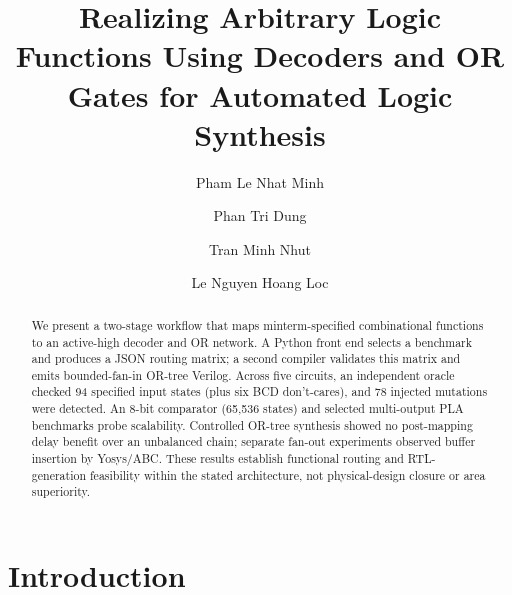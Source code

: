 \documentclass[runningheads]{llncs}
\begin{document}
\title{Realizing Arbitrary Logic Functions Using Decoders and OR Gates for Automated Logic Synthesis}


\author{
Pham Le Nhat Minh \and
Phan Tri Dung \and
Tran Minh Nhut \and
Le Nguyen Hoang Loc
}



\maketitle

\begin{abstract}
We present a two-stage workflow that maps minterm-specified combinational functions to an active-high decoder and OR network. A Python front end selects a benchmark and produces a JSON routing matrix; a second compiler validates this matrix and emits bounded-fan-in OR-tree Verilog. Across five circuits, an independent oracle checked 94 specified input states (plus six BCD don't-cares), and 78 injected mutations were detected. An 8-bit comparator (65,536 states) and selected multi-output PLA benchmarks probe scalability. Controlled OR-tree synthesis showed no post-mapping delay benefit over an unbalanced chain; separate fan-out experiments observed buffer insertion by Yosys/ABC. These results establish functional routing and RTL-generation feasibility within the stated architecture, not physical-design closure or area superiority.

\end{abstract}

\section{Introduction}
\end{document}

